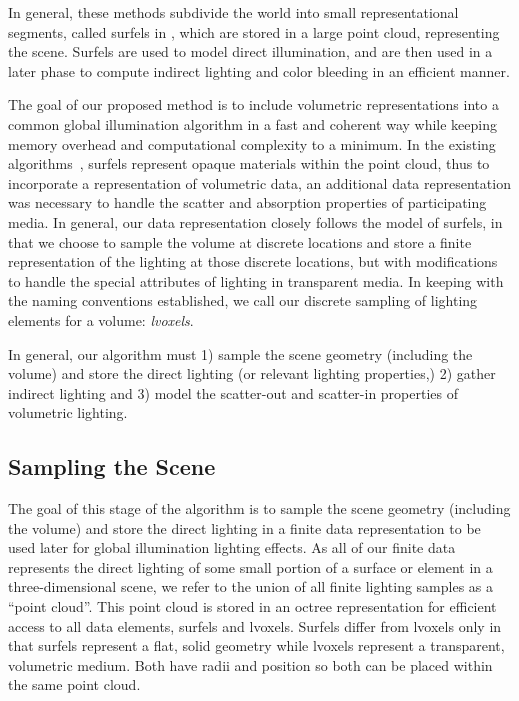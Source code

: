 \documentclass[runningheads]{llncs}
\begin{document}
In general, these methods subdivide the world into small representational segments, called surfels in \cite{christensen:2008}, which are stored in a large point cloud, representing the scene.  Surfels are used to model direct illumination, and are then used in a later phase to compute indirect lighting and color bleeding in an efficient manner.  

The goal of our proposed method is to include volumetric representations into a common global illumination algorithm in a fast and coherent way while keeping memory overhead and computational complexity to a minimum.  In the existing algorithms~\cite{christensen:2008}, surfels represent opaque materials within the point cloud, thus to incorporate a representation of volumetric data, an additional data representation was necessary to handle the scatter and absorption properties of participating media.  In general, our data representation closely follows the model of surfels, in that we choose to sample the volume at discrete locations and store a finite representation of the lighting at those discrete locations, but with modifications to handle the special attributes of lighting in transparent media.  In keeping with the naming conventions established, we call our discrete sampling of lighting elements for a volume: \emph{lvoxels}.  

In general, our algorithm must 1) sample the scene geometry (including the volume) and store the direct lighting (or relevant lighting properties,) 2) gather indirect lighting and 3) model the scatter-out and scatter-in properties of volumetric lighting.

\subsection{Sampling the Scene}
The goal of this stage of the algorithm is to sample the scene geometry (including the volume) and store the direct lighting in a finite data representation to be used later for global illumination lighting effects.  As all of our finite data represents the direct lighting of some small portion of a surface or element in a three-dimensional scene, we refer to the union of all finite lighting samples as a ``point cloud''.  This point cloud is stored in an octree representation for efficient access to all data elements, surfels and lvoxels.  Surfels differ from lvoxels only in that surfels represent a flat, solid geometry while lvoxels represent a transparent, volumetric medium.  Both have radii and position so both can be placed within the same point cloud.  
\end{document}
